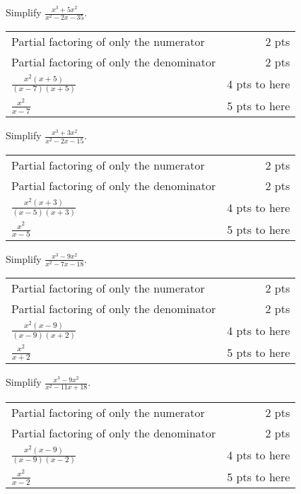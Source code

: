 {
	Simplify $\displaystyle \frac{x^3+5x^2}{x^2-2x-35}$.
}
{
	\begin{tabular}{l r}
	Partial factoring of only the numerator & 2 pts\\
	Partial factoring of only the denominator & 2 pts\\
	$\displaystyle \frac{x^2(x+5)}{(x-7)(x+5)}$ & 4 pts to here\\[10pt]
	$\displaystyle \frac{x^2}{x-7}$ & 5 pts to here\\
	\end{tabular}
}

{
	Simplify $\displaystyle \frac{x^3+3x^2}{x^2-2x-15}$.
}
{
	\begin{tabular}{l r}
	Partial factoring of only the numerator & 2 pts\\
	Partial factoring of only the denominator & 2 pts\\
	$\displaystyle \frac{x^2(x+3)}{(x-5)(x+3)}$ & 4 pts to here\\[10pt]
	$\displaystyle \frac{x^2}{x-5}$ & 5 pts to here\\
	\end{tabular}
}

{
	Simplify $\displaystyle \frac{x^3-9x^2}{x^2-7x-18}$.
}
{
	\begin{tabular}{l r}
	Partial factoring of only the numerator & 2 pts\\
	Partial factoring of only the denominator & 2 pts\\
	$\displaystyle \frac{x^2(x-9)}{(x-9)(x+2)}$ & 4 pts to here\\[10pt]
	$\displaystyle \frac{x^2}{x+2}$ & 5 pts to here\\
	\end{tabular}
}

{
	Simplify $\displaystyle \frac{x^3-9x^2}{x^2-11x+18}$.
}
{
	\begin{tabular}{l r}
	Partial factoring of only the numerator & 2 pts\\
	Partial factoring of only the denominator & 2 pts\\
	$\displaystyle \frac{x^2(x-9)}{(x-9)(x-2)}$ & 4 pts to here\\[10pt]
	$\displaystyle \frac{x^2}{x-2}$ & 5 pts to here\\
	\end{tabular}
}
